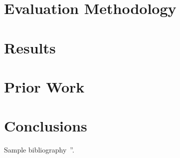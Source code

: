 \documentclass[12pt,letterpaper]{article}
\begin{document}
\section{Evaluation Methodology} \label{sec:evaluation}

\section{Results} \label{sec:results}

\section{Prior Work} \label{sec:prior_work}

\section{Conclusions} \label{sec:conclusions}


Sample bibliography~\cite{Authors11b}''.




{\small


}
\end{document}
